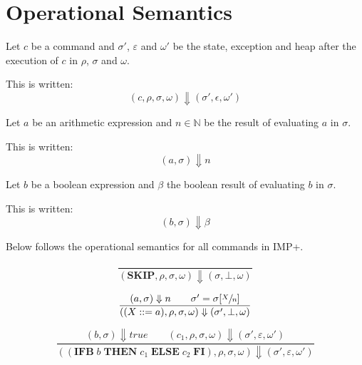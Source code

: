 \section{Operational Semantics}

\begin{notation}
Let $c$ be a command and $\sigma'$, $\varepsilon$ and $\omega'$ be the state, exception and heap after the execution of $c$ in $\rho$, $\sigma$ and $\omega$.

This is written:
\begin{equation}
(c,\rho,\sigma,\omega) \Downarrow (\sigma',\epsilon,\omega')
\end{equation}
\end{notation}

\begin{notation}
Let $a$ be an arithmetic expression and $n\in\mathbb{N}$ be the result of evaluating $a$ in $\sigma$.

This is written:
\begin{equation}
(a,\sigma) \Downarrow n
\end{equation}
\end{notation}

\begin{notation}
Let $b$ be a boolean expression and $\beta$ the boolean result of evaluating $b$ in $\sigma$.

This is written:
\begin{equation}
(b,\sigma) \Downarrow \beta
\end{equation}
\end{notation}

Below follows the operational semantics for all commands in IMP+.

\begin{equation}
\frac{}{(\textbf{SKIP}, \rho, \sigma, \omega) \Downarrow (\sigma, \bot, \omega)}
\end{equation}

\begin{equation}
\frac{(a, \sigma) \Downarrow n \qquad \sigma' = \sigma[\sfrac{X}{n}]}{((X ::= a), \rho, \sigma, \omega) \Downarrow (\sigma', \bot, \omega)}
\end{equation}

\begin{equation}
\frac{(b, \sigma) \Downarrow true \qquad (c_1, \rho, \sigma, \omega) \Downarrow (\sigma', \varepsilon, \omega')}{((\textbf{IFB}\; b\; \textbf{THEN}\; c_1\; \textbf{ELSE}\; c_2\; \textbf{FI}), \rho, \sigma, \omega) \Downarrow (\sigma', \varepsilon, \omega')}
\end{equation}

